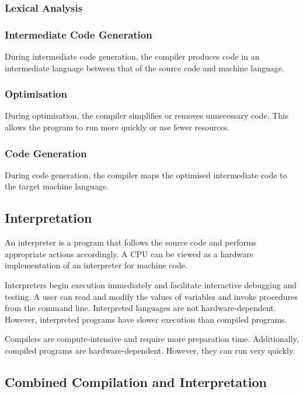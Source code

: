 \subsubsection{Lexical Analysis}

\subsubsection{Intermediate Code Generation}

During intermediate code generation, the compiler produces code in an intermediate language between that of the source code and machine language.

\subsubsection{Optimisation}

During optimisation, the compiler simplifies or removes unnecessary code.
This allows the program to run more quickly or use fewer resources.

\subsubsection{Code Generation}

During code generation, the compiler maps the optimised intermediate code to the target machine language.

\subsection{Interpretation}

An interpreter is a program that follows the source code and performs appropriate actions accordingly.
A CPU can be viewed as a hardware implementation of an interpreter for machine code.

Interpreters begin execution immediately and facilitate interactive debugging and testing.
A user can read and modify the values of variables and invoke procedures from the command line.
Interpreted languages are not hardware-dependent.
However, interpreted programs have slower execution than compiled programs.

Compilers are compute-intensive and require more preparation time.
Additionally, compiled programs are hardware-dependent.
However, they can run very quickly.

\subsection{Combined Compilation and Interpretation}

